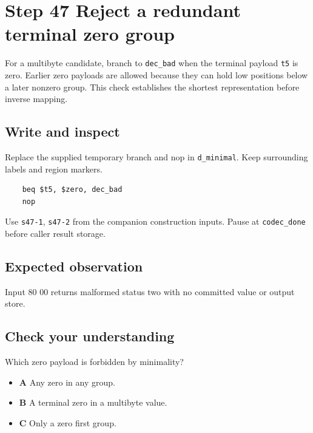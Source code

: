 \section{Step 47 Reject a redundant terminal zero group}\label{delta-s47}

For a multibyte candidate, branch to \texttt{dec\_bad} when the terminal payload \texttt{t5} is zero. Earlier zero payloads are allowed because they can hold low positions below a later nonzero group. This check establishes the shortest representation before inverse mapping.

\subsection{Write and inspect}
Replace the supplied temporary branch and nop in \texttt{d\_minimal}. Keep surrounding labels and region markers.

\begin{verbatim}
    beq $t5, $zero, dec_bad
    nop
\end{verbatim}
Use \texttt{s47-1}, \texttt{s47-2} from the companion construction inputs. Pause at \texttt{codec\_done} before caller result storage.

\subsection{Expected observation}
Input 80 00 returns malformed status two with no committed value or output store.

\subsection{Check your understanding}
Which zero payload is forbidden by minimality?

\begin{itemize}
\item \textbf{A} Any zero in any group.
\item \textbf{B} A terminal zero in a multibyte value.
\item \textbf{C} Only a zero first group.
\end{itemize}
